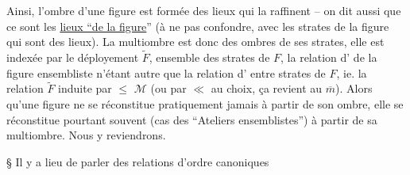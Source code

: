 Ainsi, l'ombre d'une figure est formée des lieux qui la raffinent -- on dit aussi que ce sont les \uline{lieux ``de la figure}'' (à ne pas confondre, avec les strates de la figure qui sont des lieux). La multiombre est donc  des ombres de ses strates, elle est indexée par le déployement $\widetilde F$, ensemble des strates de $F$, la relation d' de la figure ensembliste n'étant autre que la relation d' entre strates de $F$, ie. la relation  $\widetilde F$ induite par $\leq$  $\mathcal{M}$ (ou par $\ll$ au choix, ça revient au $\overline m$). Alors qu'une figure ne se réconstitue pratiquement jamais à partir de son ombre, elle se réconstitue pourtant souvent (cas des ``Ateliers ensemblistes'') à partir de sa multiombre. Nous y reviendrons.

\S{} Il y a lieu de parler des relations d'ordre canoniques
